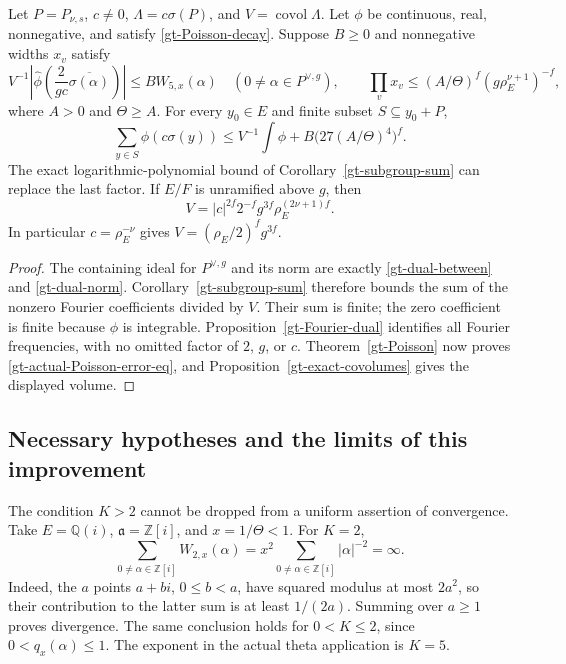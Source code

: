 \begin{corollary}\label{gt-actual-Poisson-error}
Let $P=P_{\nu,s}$, $c\ne0$, $\Lambda=c\sigma(P)$, and
$V=\operatorname{covol}\Lambda$.
Let $\phi$ be continuous, real, nonnegative, and satisfy
\eqref{gt-Poisson-decay}.
Suppose $B\geq0$ and nonnegative widths $x_v$ satisfy
\[
 V^{-1}\left|\widehat\phi
              \left(\frac2{gc}\overline{\sigma(\alpha)}\right)\right|
       \leq B W_{5,x}(\alpha)
       \quad(0\ne\alpha\in P^{\vee,g}),
 \qquad
 \prod_vx_v\leq(A/\Theta)^f(g\rho_E^{\nu+1})^{-f},
\]
where $A>0$ and $\Theta\geq A$.
For every $y_0\in E$ and finite subset $S\subseteq y_0+P$,
\begin{equation}\label{gt-actual-Poisson-error-eq}
 \sum_{y\in S}\phi(c\sigma(y))
       \leq V^{-1}\int\phi
                   +B\bigl(27(A/\Theta)^4\bigr)^f.
\end{equation}
The exact logarithmic-polynomial bound of
Corollary~\ref{gt-subgroup-sum} can replace the last factor.
If $E/F$ is unramified above $g$, then
\[
 V=|c|^{2f}2^{-f}g^{3f}\rho_E^{(2\nu+1)f}.
\]
In particular $c=\rho_E^{-\nu}$ gives
$V=(\rho_E/2)^fg^{3f}$.
\end{corollary}

\begin{proof}
The containing ideal for $P^{\vee,g}$ and its norm are exactly
\eqref{gt-dual-between} and \eqref{gt-dual-norm}.
Corollary~\ref{gt-subgroup-sum} therefore bounds the sum of
the nonzero Fourier coefficients divided by $V$.
Their sum is finite; the zero coefficient is finite because
$\phi$ is integrable.  Proposition~\ref{gt-Fourier-dual}
identifies all Fourier frequencies, with no omitted factor
of $2$, $g$, or $c$.  Theorem~\ref{gt-Poisson} now proves
\eqref{gt-actual-Poisson-error-eq}, and
Proposition~\ref{gt-exact-covolumes} gives the displayed volume.
\end{proof}

\subsection{Necessary hypotheses and the limits of this improvement}

\begin{example}\label{gt-critical-exponent}
The condition $K>2$ cannot be dropped from a uniform assertion of
convergence.  Take $E=\mathbb Q(i)$,
$\mathfrak a=\mathbb Z[i]$, and $x=1/\Theta<1$.  For $K=2$,
\[
 \sum_{0\ne\alpha\in\mathbb Z[i]}W_{2,x}(\alpha)
       =x^2\sum_{0\ne\alpha\in\mathbb Z[i]}|\alpha|^{-2}
       =\infty.
\]
Indeed, the $a$ points $a+bi$, $0\leq b<a$, have squared modulus
at most $2a^2$, so their contribution to the latter sum is at least
$1/(2a)$.  Summing over $a\geq1$ proves divergence.  The same
conclusion holds for $0<K\leq2$, since $0<q_x(\alpha)\leq1$.
The exponent in the actual theta application is $K=5$.
\end{example}

